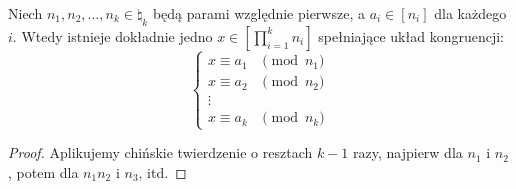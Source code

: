 \begin{corollary}
	Niech \(n_1, n_2, \ldots, n_k \in \natural_k\) będą parami względnie pierwsze,
	a \(a_i \in [n_i]\) dla każdego \(i\). Wtedy istnieje dokładnie jedno \(x \in [\prod_{i=1}^{k} n_i]\)
	spełniające układ kongruencji:
	\begin{equation*}
		\begin{cases}
			x \equiv a_1 & \pmod {n_1} \\
			x \equiv a_2 & \pmod {n_2} \\
			\vdots                     \\
			x \equiv a_k & \pmod {n_k}
		\end{cases}
	\end{equation*}
\end{corollary}
\begin{proof}
	Aplikujemy chińskie twierdzenie o resztach \(k-1\) razy, najpierw dla \(n_1\) i \(n_2\),
	potem dla \(n_1n_2\) i \(n_3\), itd.
\end{proof}

